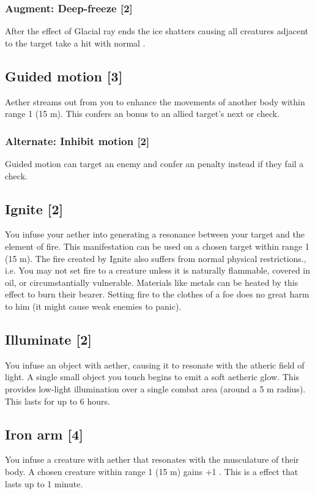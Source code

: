 \subsubsection{Augment: Deep-freeze [2]}
After the effect of Glacial ray ends the ice shatters causing all creatures adjacent to the target take a hit with normal .


\subsection{Guided motion [3]}
Aether streams out from you to enhance the movements of another body within range 1 (15 m). This confers an  bonus to an allied target's next  or  check.
\subsubsection{Alternate: Inhibit motion [2]}
Guided motion can target an enemy and confer an  penalty instead if they fail a  check.


\subsection{Ignite [2]}
\label{spell:ignite}
You infuse your aether into generating a resonance between your target and the element of fire. This manifestation can be used on a chosen target within range 1 (15 m). The fire created by Ignite also suffers from normal physical restrictions., i.e. You may not set fire to a creature unless it is naturally flammable, covered in oil, or circumstantially vulnerable. Materials like metals can be heated by this effect to burn their bearer. Setting fire to the clothes of a foe does no great harm to him (it might cause weak enemies to panic).


\subsection{Illuminate [2]}
\label{spell:illuminate}
You infuse an object with aether, causing it to resonate with the atheric field of light. A single small object you touch begins to emit a soft aetheric glow. This provides low-light illumination over a single combat area (around a 5 m radius). This lasts for up to 6 hours.


\subsection{Iron arm [4]}
You infuse a creature with aether that resonates with the musculature of their body. A chosen creature within range 1 (15 m) gains +1 . This is a  effect that lasts up to 1 minute.


